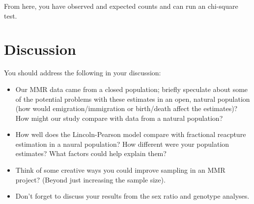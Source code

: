 \documentclass[]{book}
\providecommand{\tightlist}{%
  \setlength{\itemsep}{0pt}\setlength{\parskip}{0pt}}
\begin{document}
From here, you have observed and expected counts and can run an
chi-square test.

\section{Discussion}\label{discussion-2}

You should address the following in your discussion:

\begin{itemize}
\tightlist
\item
  Our MMR data came from a closed population; briefly speculate about
  some of the potential problems with these estimates in an open,
  natural population (how would emigration/immigration or birth/death
  affect the estimates)? How might our study compare with data from a
  natural population?
\item
  How well does the Lincoln-Pearson model compare with fractional
  reacpture estimation in a naural population? How different were your
  population estimates? What factors could help explain them?
\item
  Think of some creative ways you could improve sampling in an MMR
  project? (Beyond just increasing the sample size).\\
\item
  Don't forget to discuss your results from the sex ratio and genotype
  analyses.
\end{itemize}


\end{document}
